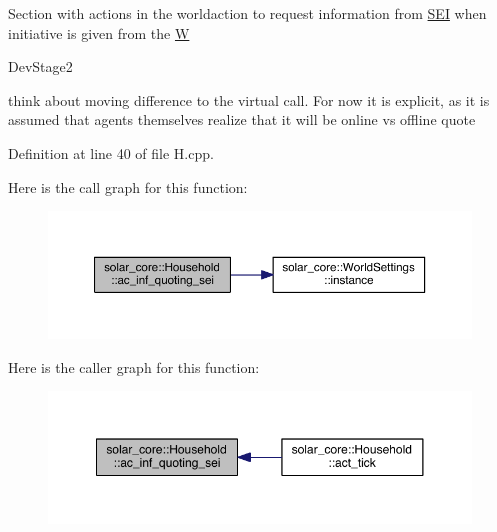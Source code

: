 Section with actions in the worldaction to request information from \hyperlink{classsolar__core_1_1_s_e_i}{S\+E\+I} when initiative is given from the \hyperlink{classsolar__core_1_1_w}{W} \begin{DoxyRefDesc}{Dev\+Stage2}
\item[\hyperlink{_dev_stage2__DevStage2000002}{Dev\+Stage2}]think about moving difference to the virtual call. For now it is explicit, as it is assumed that agents themselves realize that it will be online vs offline quote \end{DoxyRefDesc}


Definition at line 40 of file H.\+cpp.



Here is the call graph for this function\+:
\nopagebreak
\begin{figure}[H]
\begin{center}
\leavevmode
\includegraphics[width=350pt]{classsolar__core_1_1_household_a165b7c64c72e5ed4ea08307e32082517_cgraph}
\end{center}
\end{figure}




Here is the caller graph for this function\+:
\nopagebreak
\begin{figure}[H]
\begin{center}
\leavevmode
\includegraphics[width=350pt]{classsolar__core_1_1_household_a165b7c64c72e5ed4ea08307e32082517_icgraph}
\end{center}
\end{figure}


\hypertarget{classsolar__core_1_1_household_ac73de13d0d4b4e01b2defbb85872c4b2}{}

